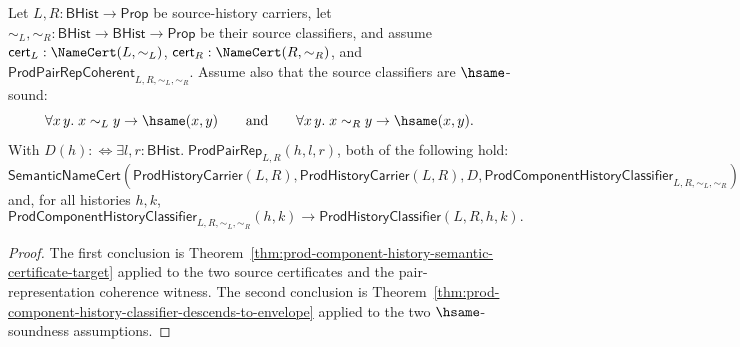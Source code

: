 \begin{theorem}
\label{thm:prod-componentwise-certificate-refines-checked-envelope}
Let $L,R:\mathsf{BHist}\to\mathsf{Prop}$ be source-history carriers, let
$\sim_L,\sim_R:\mathsf{BHist}\to\mathsf{BHist}\to\mathsf{Prop}$ be their source
classifiers, and assume $\mathsf{cert}_L:\NameCert(L,\sim_L)$,
$\mathsf{cert}_R:\NameCert(R,\sim_R)$, and
$\mathsf{ProdPairRepCoherent}_{L,R,\sim_L,\sim_R}$. Assume also that the source
classifiers are $\hsame$-sound:
$$
\forall x\,y.\;x\sim_L y\to\hsame(x,y)
\qquad\hbox{and}\qquad
\forall x\,y.\;x\sim_R y\to\hsame(x,y).
$$
With $D(h):\Longleftrightarrow
\exists l,r:\mathsf{BHist}.\;\mathsf{ProdPairRep}_{L,R}(h,l,r)$, both of the
following hold:
$$
\mathsf{SemanticNameCert}(\mathsf{ProdHistoryCarrier}(L,R),
\mathsf{ProdHistoryCarrier}(L,R),
D,
\mathsf{ProdComponentHistoryClassifier}_{L,R,\sim_L,\sim_R})
$$
and, for all histories $h,k$,
$$
\mathsf{ProdComponentHistoryClassifier}_{L,R,\sim_L,\sim_R}(h,k)
\to
\mathsf{ProdHistoryClassifier}(L,R,h,k).
$$
\end{theorem}
\begin{proof}
The first conclusion is Theorem~\ref{thm:prod-component-history-semantic-certificate-target}
applied to the two source certificates and the pair-representation coherence
witness. The second conclusion is
Theorem~\ref{thm:prod-component-history-classifier-descends-to-envelope}
applied to the two $\hsame$-soundness assumptions.
\end{proof}

